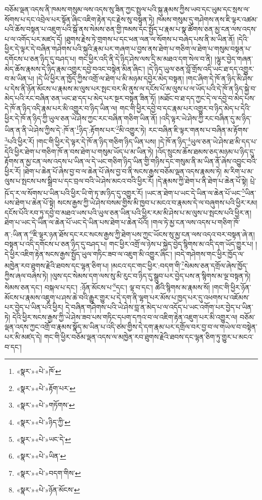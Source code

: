 བཅོམ་ལྡན་འདས་ནི་ཁམས་གསུམ་ལས་འདས་སུ་ཟིན་ཀྱང་སྤྲུལ་པའི་སྐུ་རྣམས་ཀྱིས་ཡབ་དང་ཡུམ་དང་སྲས་ལ་སོགས་པ་དང་འབྲེལ་པར་སྟོན་ཞིང་འཇིག་རྟེན་དང་རྗེས་སུ་བསྟུན་ཏེ། ཁམས་གསུམ་དུ་གཤེགས་ནས་ཇི་ལྟར་འཚམ་པའི་ཆོས་བསྟན་པ་འཇུག་པའི་སྒོ་ནས་སེམས་ཅན་གྱི་ཁམས་དང་སྤྱོད་པ་རྣམ་པ་སྣ་ཚོགས་ཅན་མྱ་ངན་ལས་འདས་པ་ལ་འགོད་པར་མཛད་དོ། །ཐུགས་རྗེས་ཏེ་གྲགས་པ་དང་ཕན་ལན་ལ་སོགས་པ་བཞེད་པས་ནི་མ་ཡིན་ནོ། །དེའི་ཕྱིར་དེ་ལྟར་དེ་བཞིན་གཤེགས་པའི་སྐུའི་རྣམ་པར་གཞག་པ་བྱས་ནས་ཐེག་པ་གཅིག་ལ་ཐེག་པ་གསུམ་བསྟན་པ་དགོངས་པ་ཅན་ཉིད་དུ་བཤད་པ། གང་ཕྱིར་འདི་ནི་དེ་ཉིད་ཤེས་ལས་དྲི་མ་མཐའ་དག་སེལ་བ་ནི། །ལྷུར་བྱེད་གཞན་མེད་ཆོས་རྣམས་དེ་ཉིད་རྣམ་འགྱུར་དབྱེ་བའང་བསྟེན་མིན་ཞིང་། །དེ་ཉིད་ཡུལ་ཅན་བློ་གྲོས་འདི་ཡང་ཐ་དད་འགྱུར་བ་མ་ཡིན་པ། །དེ་ཡི་ཕྱིར་ན་ཁྱོད་ཀྱིས་འགྲོ་ལ་ཐེག་པ་མི་མཉམ་དབྱེར་མེད་བསྟན། །གང་ཞིག་དེ་ཁོ་ན་ཉིད་མི་ཤེས་པ་དེས་ནི་ཉོན་མོངས་པ་རྣམས་མ་ལུས་པར་སྤང་བར་མི་ནུས་ལ་དངོས་པོ་མ་ལུས་པ་ལ་ཡོད་པའི་དེ་ཁོ་ན་ཉིད་སྐྱེ་བ་མེད་པའི་རང་བཞིན་ཅན་ཡང་ཐ་དད་པ་མེད་པར་སྔར་བསྟན་ཟིན་ཏོ། །མཐོང་བ་ཐ་དད་ཀྱང་དེ་ལ་དབྱེ་བ་མེད་པས་དེ་ཁོ་ན་ཉིད་འདི་རྣམ་པར་མི་འགྱུར་བ་ཉིད་ཡིན་ལ། གང་གི་ཕྱིར་དབྱེ་བ་དང་རྣམ་པར་འགྱུར་བ་ཉིད་མེད་པ་དེའི་ཕྱིར་དེ་ཁོ་ན་ཉིད་ཀྱི་ཡུལ་ཅན་ཡེ་ཤེས་ཀྱང་རང་བཞིན་གཅིག་ཡིན་ནོ། །འདི་ལྟར་ཡེ་ཤེས་ཀྱི་རང་བཞིན་དུ་མ་ཉིད་ཡིན་ན་ནི་ཡེ་ཤེས་ཀྱིས་དེ་:ཁོ་ན་\footnote{«སྣར་»«པེ་»ཁོ་}ཉིད་:རྟོགས་པར་\footnote{«སྣར་»«པེ་»རྟོག་པར་}མི་འགྱུར་ཏེ། རང་བཞིན་ཇི་ལྟར་གནས་པ་བཞིན་མ་རྟོགས་\footnote{«སྣར་»«པེ་»གཏོགས་}པའི་ཕྱིར་རོ། །གང་གི་ཕྱིར་དེ་ལྟར་དེ་ཁོ་ན་ཉིད་གཅིག་ཉིད་ཡིན་པས། །དེ་ཁོ་ན་ཉིད་\footnote{«སྣར་»«པེ་»ཉིད་ཀྱི་}ཡུལ་ཅན་ཡེ་ཤེས་ཐ་མི་དད་པ་དེའི་ཕྱིར་ཐེག་པ་གཅིག་ཁོ་ན་བས་ཐེག་པ་གསུམ་ཡོད་པ་མ་ཡིན་ཏེ། །འོད་སྲུངས་ཆོས་ཐམས་ཅད་མཉམ་པ་ཉིད་དུ་རྟོགས་ན་མྱ་ངན་ལས་འདས་པ་ཡིན་ལ་དེ་ཡང་གཅིག་ཉིད་ཡིན་གྱི་གཉིས་དང་གསུམ་ནི་མ་ཡིན་ནོ་ཞེས་འབྱུང་བའི་ཕྱིར་རོ། །ཐེག་པ་ཆེན་པོ་ཞེས་བྱ་བ་ལ་ཆེན་པོ་ཞེས་བྱ་བ་ནི་སངས་རྒྱས་བཅོམ་ལྡན་འདས་རྣམས་ཏེ། མ་རིག་པ་མ་ལུས་པ་སྤངས་པས་སྒྲིབ་པ་དང་བྲལ་བའི་ཡེ་ཤེས་མངའ་བའི་ཕྱིར་རོ། །དེ་རྣམས་ཀྱི་ཐེག་པ་ནི་ཐེག་པ་ཆེན་པོ་སྟེ། པྲེ་ཥོ་ད་ར་ལ་སོགས་པ་ཡིན་པའི་ཕྱིར་ཡི་གེ་ཏ་ཨ་ཉིད་དུ་འགྱུར་རོ། །ཡང་ན་ཐེག་པ་ཡང་དེ་ཡིན་ལ་ཆེན་པོ་ཡང་\footnote{«སྣར་»«པེ་»ཡང་དེ་}ཡིན་པས་ཐེག་པ་ཆེན་པོ་སྟེ། སངས་རྒྱས་ཀྱི་ཡེ་ཤེས་བསམ་གྱིས་མི་ཁྱབ་པ་མངའ་བ་རྣམས་དེ་ལ་བཞུགས་པའི་ཕྱིར་རམ། དངོས་པོའི་རབ་ཏུ་དབྱེ་བ་མཐའ་ཡས་པའི་ཡུལ་ཅན་ཡིན་པའི་ཕྱིར་རམ་མི་ཤེས་པ་མ་ལུས་པ་སྤངས་པའི་ཕྱིར་ན། ཐེག་པ་ཡང་དེ་ཡིན་ལ་ཆེན་པོ་ཡང་དེ་ཡིན་པས་ཐེག་པ་ཆེན་པོའོ། །གལ་ཏེ་མྱ་ངན་ལས་འདས་པ་གཅིག་ཁོ་ན་:ཡིན་ན་\footnote{«སྣར་»«པེ་»ཡིན་}ཇི་ལྟར་ཉན་ཐོས་དང་རང་སངས་རྒྱས་ཀྱི་ཐེག་པས་ཀྱང་ཡོངས་སུ་མྱ་ངན་ལས་འདའ་བར་བསྟན་ཞེ་ན། བསྟན་པ་འདི་དགོངས་པ་ཅན་ཉིད་དུ་བཤད་པ། གང་ཕྱིར་འགྲོ་ལ་ཉེས་པ་སྐྱེད་བྱེད་སྙིགས་མ་འདི་དག་ཡོད་གྱུར་པ། །དེ་ཕྱིར་འཇིག་རྟེན་སངས་རྒྱས་སྤྱོད་ཡུལ་གཏིང་ཟབ་ལ་འཇུག་མི་འགྱུར་ཞིང་། །བདེ་གཤེགས་གང་ཕྱིར་ཁྱོད་ལ་མཁྱེན་རབ་ཐུགས་རྗེའི་ཐབས་དང་ལྷན་ཅིག་པ། །མངའ་དང་གང་ཕྱིར་:བདག་གི་\footnote{«སྣར་»«པེ་»བདག་གིས་}སེམས་ཅན་དགྲོལ་ཞེས་ཁྱོད་ཀྱིས་ཞལ་བཞེས་ཏེ། །ལུས་དང་སེམས་དག་ལས་སུ་མི་རུང་བ་ཉིད་དུ་སྒྲུབ་པར་བྱེད་པས་ན་སྙིགས་མ་ལྔ་བསྟན་ཏེ། སེམས་ཅན་དང་། བསྐལ་པ་དང་། :ཉོན་མོངས་པ་\footnote{«སྣར་»«པེ་»ཉོན་མོངས་}དང་། ལྟ་བ་དང་། ཚེའི་སྙིགས་མ་རྣམས་སོ། །གང་གི་ཕྱིར་ཉོན་མོངས་པ་རྣམས་འཇུག་པ་ཤས་ཆེ་བའི་རྒྱུར་གྱུར་པ་དེ་དག་ནི་ལྷག་པར་མོས་པ་ཁྱད་པར་དུ་འཕགས་པ་འཇོམས་པར་བྱེད་པ་ཡིན་པའི་ཕྱིར། དེ་བཞིན་གཤེགས་པའི་ཡེ་ཤེས་བླ་ན་མེད་པ་ལ་འདོད་པ་ཡང་འགོག་པར་བྱེད་པ་ཡིན་ཏེ། དེའི་ཕྱིར་སངས་རྒྱས་ཀྱི་ཡེ་ཤེས་ཟབ་པས་གཏིང་དཔག་དཀའ་བ་ལ་འཇིག་རྟེན་འཇུག་པར་མི་འགྱུར་ལ། བཅོམ་ལྡན་འདས་ཀྱང་འགྲོ་བ་རྣམས་སྣོད་མ་ཡིན་པ་འདི་ཙམ་གྱིས་དེ་དག་རྣམ་པར་དགྲོལ་བར་བྱ་བ་ལ་གཡེལ་བ་བསྟེན་པར་མི་མཛད་དེ། གང་གི་ཕྱིར་བཅོམ་ལྡན་འདས་ལ་མཁྱེན་རབ་ཐུགས་རྗེའི་ཐབས་དང་ལྷན་ཅིག་ཏུ་གྱུར་པ་མངའ་བ་དང་། 